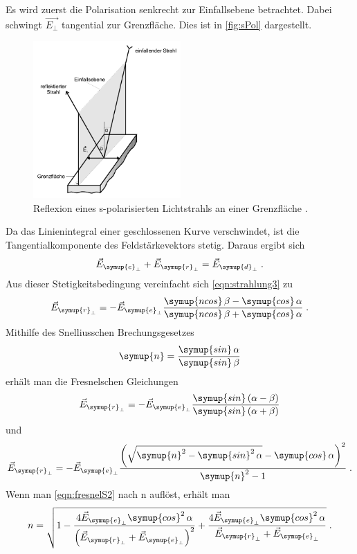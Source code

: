 Es wird zuerst die Polarisation senkrecht zur Einfallsebene betrachtet. Dabei schwingt $\vec{E_{\perp}}$ tangential zur Grenzfläche. Dies ist in 
\autoref{fig:sPol} dargestellt. 
\begin{figure}
    \centering
    \includegraphics[height = 6cm]{sPol.pdf}
    \caption{Reflexion eines s-polarisierten Lichtstrahls an einer Grenzfläche \cite{ap407}.}
    \label{fig:sPol}
\end{figure}
Da das Linienintegral einer geschlossenen Kurve verschwindet, ist die Tangentialkomponente des Feldstärkevektors stetig. Daraus ergibt sich
\begin{equation*}
    \vec{E}_{\symup{e}_{\perp}} + \vec{E}_{\symup{r}_{\perp}} = \vec{E}_{\symup{d}_{\perp}} \; .
\end{equation*}
Aus dieser Stetigkeitsbedingung vereinfacht sich \autoref{eqn:strahlung3} zu 
\begin{equation*}
    \vec{E}_{\symup{r}_{\perp}} = - \vec{E}_{\symup{e}_{\perp}} \frac{\symup{ncos}\,\beta - \symup{cos}\,\alpha}{\symup{ncos}\,\beta + \symup{cos}\,\alpha} \; .
\end{equation*}
Mithilfe des Snelliusschen Brechungsgesetzes
\begin{equation*}
    \symup{n} = \frac{\symup{sin}\, \alpha}{\symup{sin}\, \beta}
\end{equation*}
erhält man die Fresnelschen Gleichungen 
\begin{equation*}
    \vec{E}_{\symup{r}_{\perp}} = - \vec{E}_{\symup{e}_{\perp}} \frac{\symup{sin}\left(\alpha - \beta\right)}{\symup{sin}\left(\alpha + \beta\right)}
\end{equation*}
und
\begin{equation}
    \vec{E}_{\symup{r}_{\perp}} = - \vec{E}_{\symup{e}_{\perp}} \frac{\left(\sqrt{\symup{n}^2-\symup{sin}^2 \, \alpha}-\symup{cos}\, \alpha\right)^2}{\symup{n}^2 - 1} \; .
    \label{eqn:fresnelS2}
\end{equation}
Wenn man \autoref{eqn:fresnelS2} nach n auflöst, erhält man
\begin{equation*}
    n = \sqrt{1-\frac{4\vec{E}_{\symup{e}_{\perp}}\symup{cos}^2\, \alpha}{\left(\vec{E}_{\symup{r}_{\perp}}+\vec{E}_{\symup{e}_{\perp}}\right)^2}+\frac{4\vec{E}_{\symup{e}_{\perp}}\symup{cos}^2\, \alpha}{\vec{E}_{\symup{r}_{\perp}}+\vec{E}_{\symup{e}_{\perp}}}} \; .
\end{equation*}

